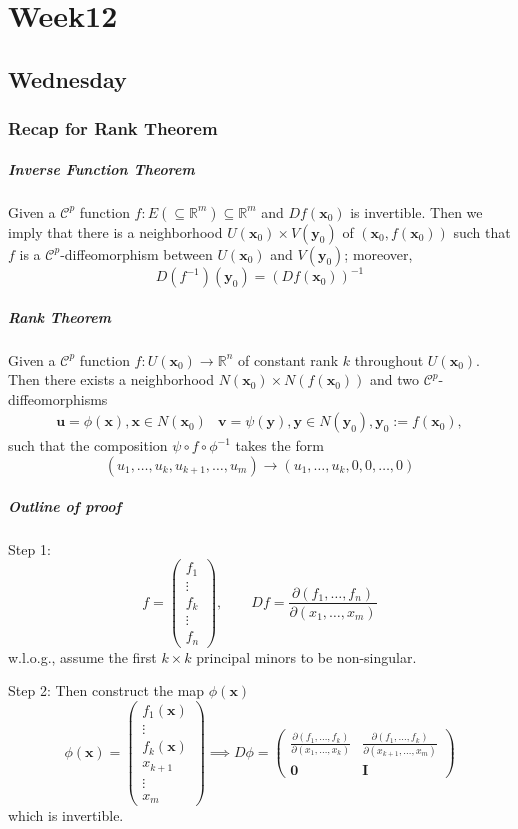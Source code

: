 
\chapter{Week12}
\section{Wednesday}
\subsection{Recap for Rank Theorem}
\paragraph{Inverse Function Theorem}
Given a $\mathcal{C}^p$ function $f:E(\subseteq\mathbb{R}^m)\subseteq\mathbb{R}^m$ and $Df(\bm x_0)$ is invertible. Then we imply that there is a neighborhood $U(\bm x_0)\times V(\bm y_0)$ of $(\bm x_0,f(\bm x_0))$ such that $f$ is a $\mathcal{C}^p$-diffeomorphism between $U(\bm x_0)$ and $V(\bm y_0)$; moreover,
\[
D(f^{-1})(\bm y_0)=(Df(\bm x_0))^{-1}
\]

\paragraph{Rank Theorem}
Given a $\mathcal{C}^p$ function $f:U(\bm x_0)\to\mathbb{R}^n$ of constant rank $k$ throughout $U(\bm x_0)$. Then there exists a neighborhood $N(\bm x_0)\times N(f(\bm x_0))$ and two $\mathcal{C}^p$-diffeomorphisms
\[
\begin{array}{ll}
\bm u=\phi(\bm x), \bm x\in N(\bm x_0)
&
\bm v=\psi(\bm y), \bm y\in N(\bm y_0), \bm y_0:=f(\bm x_0),
\end{array}
\]
such that the composition $\psi\circ f\circ\phi^{-1}$ takes the form
\[
(u_1,\dots,u_k,u_{k+1},\dots,u_m)\to
(u_1,\dots,u_k,0,0,\dots,0)
\]
\paragraph{Outline of proof}
Step 1:
\[
f=\begin{pmatrix}
f_1\\\vdots\\f_k\\\vdots\\f_n
\end{pmatrix},\qquad
Df=\frac{\partial(f_1,\dots,f_n)}{\partial(x_1,\dots,x_m)}
\]
w.l.o.g., assume the first $k\times k$ principal minors to be non-singular.

Step 2: Then construct the map $\phi(\bm x)$
\[
\phi(\bm x)=\begin{pmatrix}
f_1(\bm x)\\\vdots\\f_k(\bm x)\\x_{k+1}\\\vdots\\x_m
\end{pmatrix}\implies
D\phi=\begin{pmatrix}
\frac{\partial(f_1,\dots,f_k)}{\partial(x_1,\dots,x_k)}&
\frac{\partial(f_1,\dots,f_k)}{\partial(x_{k+1},\dots,x_m)}
\\
\bm0&\bm I
\end{pmatrix}
\]
which is invertible.

